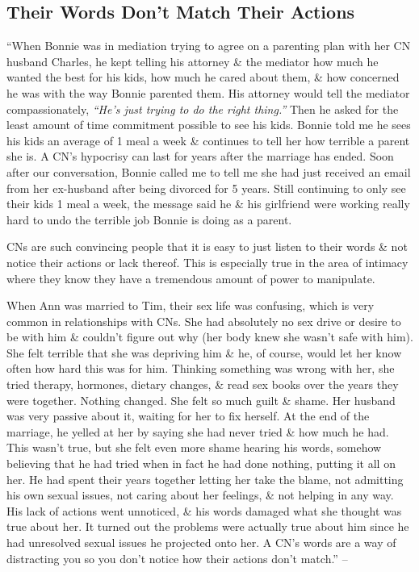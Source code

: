 \documentclass{article}
\numberwithin{equation}{section}
\begin{document}
\subsection{Their Words Don't Match Their Actions}
``When Bonnie was in mediation trying to agree on a parenting plan with her CN husband Charles, he kept telling his attorney \& the mediator how much he wanted the best for his kids, how much he cared about them, \& how concerned he was with the way Bonnie parented them. His attorney would tell the mediator compassionately, \textit{``He's just trying to do the right thing.''} Then he asked for the least amount of time commitment possible to see his kids. Bonnie told me he sees his kids an average of 1 meal a week \& continues to tell her how terrible a parent she is. A CN's hypocrisy can last for years after the marriage has ended. Soon after our conversation, Bonnie called me to tell me she had just received an email from her ex-husband after being divorced for 5 years. Still continuing to only see their kids 1 meal a week, the message said he \& his girlfriend were working really hard to undo the terrible job Bonnie is doing as a parent.

CNs are such convincing people that it is easy to just listen to their words \& not notice their actions or lack thereof. This is especially true in the area of intimacy where they know they have a tremendous amount of power to manipulate.

When Ann was married to Tim, their sex life was confusing, which is very common in relationships with CNs. She had absolutely no sex drive or desire to be with him \& couldn't figure out why (her body knew she wasn't safe with him). She felt terrible that she was depriving him \& he, of course, would let her know often how hard this was for him. Thinking something was wrong with her, she tried therapy, hormones, dietary changes, \& read sex books over the years they were together. Nothing changed. She felt so much guilt \& shame. Her husband was very passive about it, waiting for her to fix herself. At the end of the marriage, he yelled at her by saying she had never tried \& how much he had. This wasn't true, but she felt even more shame hearing his words, somehow believing that he had tried when in fact he had done nothing, putting it all on her. He had spent their years together letting her take the blame, not admitting his own sexual issues, not caring about her feelings, \& not helping in any way. His lack of actions went unnoticed, \& his words damaged what she thought was true about her. It turned out the problems were actually true about him since he had unresolved sexual issues he projected onto her. A CN's words are a way of distracting you so you don't notice how their actions don't match.'' -- \cite[pp. 58--59]{Mirza2017}
\end{document}
